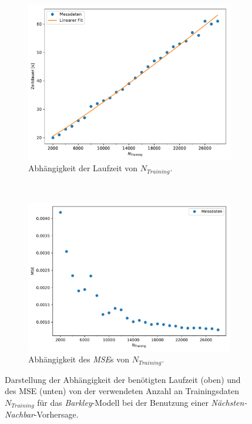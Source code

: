 \begin{figure}[H]
	\centering
	\begin{subfigure}{.95\textwidth}
		\centering
		\hspace*{0.3cm}
		\includegraphics[width=.76\textwidth]{figures/results/cross_prediction/nn_trainlength_uv_time.pdf}
		\caption{Abhängigkeit der Laufzeit von $N_{Training}$.}
	\end{subfigure}%
	\\
	\begin{subfigure}{.95\textwidth}
		\centering
		\includegraphics[width=.80\textwidth]{figures/results/cross_prediction/nn_trainlength_uv_mse.pdf}
		\caption{Abhängigkeit des \textit{MSE}s von $N_{Training}$.}
	\end{subfigure}%
	\caption{Darstellung der Abhängigkeit der benötigten Laufzeit (oben) und des MSE (unten) von der verwendeten Anzahl an Trainingsdaten $N_{Training}$ für das \textit{Barkley}-Modell bei der Benutzung einer \textit{Nächsten-Nachbar}-Vorhersage.}
	\label{fig:exp_cross_nn_trainlength_mse_time_barkley}
\end{figure}


